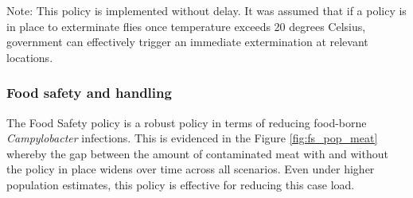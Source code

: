 Note: This policy is implemented without delay. It was assumed that if a policy is in place to exterminate flies once temperature exceeds 20 degrees Celsius, government can effectively trigger an immediate extermination at relevant locations.

\subsubsection{Food safety and handling}
\label{sec: food safety}
The Food Safety policy is a robust policy in terms of reducing food-borne \textit{Campylobacter} infections. This is evidenced in the Figure \ref{fig:fs_pop_meat}
whereby the gap between the amount of contaminated meat with and without the policy in place widens over time across all scenarios. Even under higher population estimates, this policy is effective for reducing this case load.


